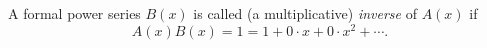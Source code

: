 

\setcounter{section}{2}
\setcounter{subsection}{2}
\setcounter{dfn}{2}

\begin{dfn}
A formal power series $B(x)$ is called (a multiplicative) \emph{inverse} of $A(x)$ if
\[
A(x)B(x) = 1 = 1 + 0 \cdot x + 0 \cdot x^2 + \cdots.
\]
\end{dfn}

